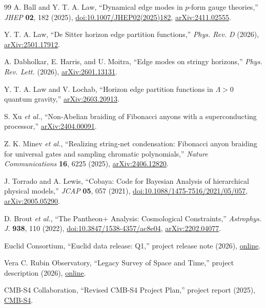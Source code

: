 \documentclass[aps,prd,reprint,nofootinbib,superscriptaddress,floatfix]{revtex4-2}
\numberwithin{equation}{section}
\theoremstyle{definition}
\theoremstyle{plain}
\begin{document}
\begin{thebibliography}{99}
A. Ball and Y. T. A. Law,
``Dynamical edge modes in \(p\)-form gauge theories,''
\emph{JHEP} \textbf{02}, 182 (2025),
\href{https://doi.org/10.1007/JHEP02(2025)182}{doi:10.1007/JHEP02(2025)182},
\href{https://arxiv.org/abs/2411.02555}{arXiv:2411.02555}.

Y. T. A. Law,
``De Sitter horizon edge partition functions,''
\emph{Phys. Rev. D} (2026),
\href{https://arxiv.org/abs/2501.17912}{arXiv:2501.17912}.

A. Dabholkar, E. Harris, and U. Moitra,
``Edge modes on stringy horizons,''
\emph{Phys. Rev. Lett.} (2026),
\href{https://arxiv.org/abs/2601.13131}{arXiv:2601.13131}.

Y. T. A. Law and V. Lochab,
``Horizon edge partition functions in \(\Lambda>0\) quantum gravity,''
\href{https://arxiv.org/abs/2603.20913}{arXiv:2603.20913}.


S. Xu \emph{et al.},
``Non-Abelian braiding of Fibonacci anyons with a superconducting processor,''
\href{https://arxiv.org/abs/2404.00091}{arXiv:2404.00091}.

Z. K. Minev \emph{et al.},
``Realizing string-net condensation: Fibonacci anyon braiding for universal
gates and sampling chromatic polynomials,''
\emph{Nature Communications} \textbf{16}, 6225 (2025),
\href{https://arxiv.org/abs/2406.12820}{arXiv:2406.12820}.

J. Torrado and A. Lewis,
``Cobaya: Code for Bayesian Analysis of hierarchical physical models,''
\emph{JCAP} \textbf{05}, 057 (2021),
\href{https://doi.org/10.1088/1475-7516/2021/05/057}{doi:10.1088/1475-7516/2021/05/057},
\href{https://arxiv.org/abs/2005.05290}{arXiv:2005.05290}.

D. Brout \emph{et al.},
``The Pantheon+ Analysis: Cosmological Constraints,''
\emph{Astrophys. J.} \textbf{938}, 110 (2022),
\href{https://doi.org/10.3847/1538-4357/ac8e04}{doi:10.3847/1538-4357/ac8e04},
\href{https://arxiv.org/abs/2202.04077}{arXiv:2202.04077}.

Euclid Consortium,
``Euclid data release: Q1,''
project release note (2026),
\href{https://www.euclid-ec.org/science/q1/}{online}.

Vera C. Rubin Observatory,
``Legacy Survey of Space and Time,''
project description (2026),
\href{https://rubinobservatory.org/explore/how-rubin-works/lsst}{online}.

CMB-S4 Collaboration,
``Revised CMB-S4 Project Plan,''
project report (2025),
\href{https://cmb-s4.org/}{CMB-S4}.


\end{thebibliography}
\end{document}
